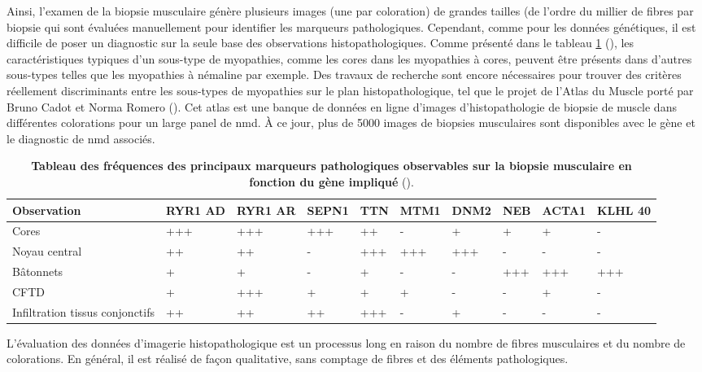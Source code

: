 Ainsi, l'examen de la biopsie musculaire génère plusieurs images (une par coloration) de grandes tailles (de l'ordre du millier de fibres par biopsie qui sont évaluées manuellement pour identifier les marqueurs pathologiques. Cependant, comme pour les données génétiques, il est difficile de poser un diagnostic sur la seule base des observations histopathologiques. Comme présenté dans le tableau \ref{tab:histopath} (\cite{jungbluth_congenital_2018}), les caractéristiques typiques d'un sous-type de myopathies, comme les cores dans les myopathies à cores, peuvent être présents dans d'autres sous-types telles que les myopathies à némaline par exemple. Des travaux de recherche sont encore nécessaires pour trouver des critères réellement discriminants entre les sous-types de myopathies sur le plan histopathologique, tel que le projet de l'Atlas du Muscle porté par Bruno Cadot et Norma Romero (\cite{cadot_atlas_2022}). Cet atlas est une banque de données en ligne d'images d'histopathologie de biopsie de muscle dans différentes colorations pour un large panel de \gls{nmd}. À ce jour, plus de 5000 images de biopsies musculaires sont disponibles avec le gène et le diagnostic de \gls{nmd} associés. 

\begin{table}[!ht]
\begin{tabularx}{\textwidth}{|p{1.8cm}|X|X|X|X|X|X|X|X|X|}
 \hline
\textbf{Observation} & \textbf{RYR1 AD} & \textbf{RYR1 AR} & \textbf{SEPN1} & \textbf{TTN} & \textbf{MTM1} & \textbf{DNM2} & \textbf{NEB} & \textbf{ACTA1} & \textbf{KLHL 40} \\
\hline
Cores & +++ & +++ & +++ & ++ & - & + & + & + & - \\
\hline
Noyau central & ++ & ++ & - & +++ & +++ & +++ & - & - & - \\
\hline
Bâtonnets  & + & + & - & + & - & - & +++ & +++ & +++ \\
\hline
CFTD & + & +++ & + & + & + & - & - & + & - \\
\hline
Infiltration tissus conjonctifs & ++ & ++ & ++ & +++ & - & + & - & - & - \\
\hline
\end{tabularx}
\caption[Tableau des fréquences des principaux marqueurs pathologiques en biopsie musculaire.]{\textbf{Tableau des fréquences des principaux marqueurs pathologiques observables sur la biopsie musculaire en fonction du gène impliqué} (\cite{jungbluth_congenital_2018}). }
\label{tab:histopath}
\end{table}
L'évaluation des données d'imagerie histopathologique est un processus long en raison du nombre de fibres musculaires et du nombre de colorations. En général, il est réalisé de façon qualitative, sans comptage de fibres et des éléments pathologiques.

